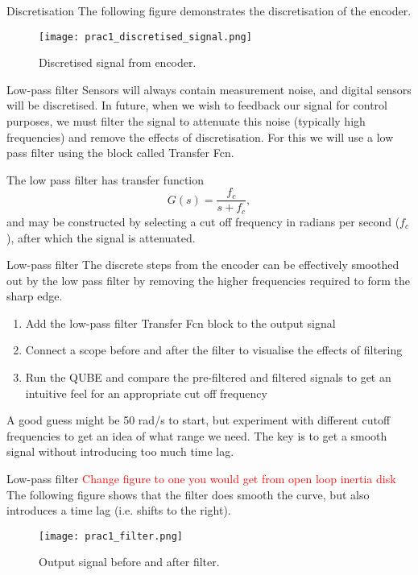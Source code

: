\documentclass[9pt]{beamer-control}
\begin{document}
\begin{frame}{Discretisation}
	The following figure demonstrates the discretisation of the encoder.
	\begin{figure}
		\centering
		\texttt{[image: prac1\_discretised\_signal.png]}
		\caption{Discretised signal from encoder.}
	\end{figure}
	
\end{frame}



\begin{frame}{Low-pass filter}
Sensors will always contain measurement noise, and digital sensors will be discretised. In future, when we wish to feedback our signal for control purposes, we must filter the signal to attenuate this noise (typically high frequencies) and remove the effects of discretisation. For this we will use a low pass filter using the block called Transfer Fcn. 

The low pass filter has transfer function
\[
G(s) = \frac{f_c}{s+f_c},
\]
and may be constructed by selecting a cut off frequency in radians per second ($f_c$), after which the signal is attenuated.

\end{frame}


\begin{frame}{Low-pass filter}
The discrete steps from the encoder can be effectively smoothed out by the low pass filter by removing the higher frequencies required to form the sharp edge. 
\begin{enumerate}
	\item Add the low-pass filter Transfer Fcn block to the output signal
	\item Connect a scope before and after the filter to visualise the effects of filtering
	\item Run the QUBE and compare the pre-filtered and filtered signals to get an intuitive feel for an appropriate cut off frequency
\end{enumerate}

 A good guess might be 50 rad/s to start, but experiment with different cutoff frequencies to get an idea of what range we need. The key is to get a smooth signal without introducing too much time lag. 
\end{frame}

\begin{frame}{Low-pass filter}
\textcolor{red}{Change figure to one you would get from open loop inertia disk}
The following figure shows that the filter does smooth the curve, but also introduces a time lag (i.e. shifts to the right).
\begin{figure}
	\centering
	\texttt{[image: prac1\_filter.png]}
	\caption{Output signal before and after filter.}
\end{figure}
\end{frame}
\end{document}
